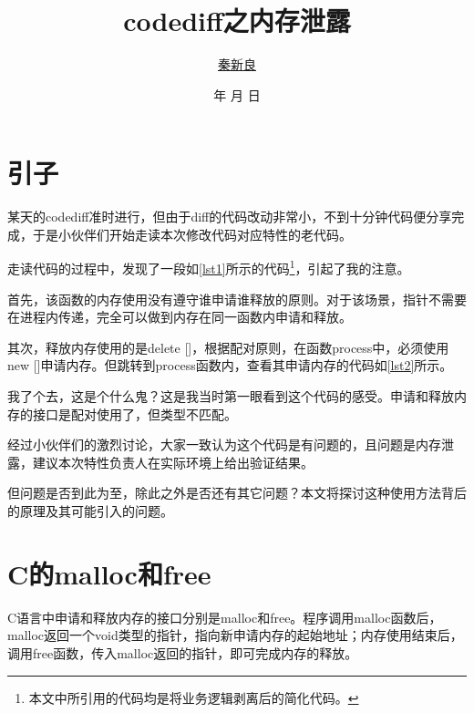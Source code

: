 \documentclass[a4paper, 12pt, titlepage]{article}
\newcommand*{\TitleFont}{\usefont{\encodingdefault}{\rmdefault}{b}{n}\fontsize{32}{40}\selectfont\CJKfamily{title}\color{seco}}%
\renewcommand{\today}{\color{seco}\number\year 年 \number\month 月 \number\day 日}
\begin{document}
\setlength{\parindent}{2em}

\title{\TitleFont codediff之内存泄露\vspace{8cm}}
\author{\href{mailto:q00148943@gmail.com}{\LARGE{秦新良}}}
\date{\vspace{0.5cm}\today}

\maketitle

\tableofcontents
\newpage

\section{引子}
某天的codediff准时进行，但由于diff的代码改动非常小，不到十分钟代码便分享完成，于是小伙伴们开始走读本次修改代码对应特性的老代码。

走读代码的过程中，发现了一段如\ref{lst1}所示的代码\footnote{本文中所引用的代码均是将业务逻辑剥离后的简化代码。}，引起了我的注意。
\begin{spacing}{1.0}
  
\end{spacing}

首先，该函数的内存使用没有遵守谁申请谁释放的原则。对于该场景，指针不需要在进程内传递，完全可以做到内存在同一函数内申请和释放。

其次，释放内存使用的是delete []，根据配对原则，在函数process中，必须使用new []申请内存。但跳转到process函数内，查看其申请内存的代码如\ref{lst2}所示。
\begin{spacing}{1.0}
  
\end{spacing}

我了个去，这是个什么鬼？这是我当时第一眼看到这个代码的感受。申请和释放内存的接口是配对使用了，但类型不匹配。

经过小伙伴们的激烈讨论，大家一致认为这个代码是有问题的，且问题是内存泄露，建议本次特性负责人在实际环境上给出验证结果。

但问题是否到此为至，除此之外是否还有其它问题？本文将探讨这种使用方法背后的原理及其可能引入的问题。

\section{C的malloc和free}
C语言中申请和释放内存的接口分别是malloc和free。程序调用malloc函数后，malloc返回一个void类型的指针，指向新申请内存的起始地址；内存使用结束后，调用free函数，传入malloc返回的指针，即可完成内存的释放。
\end{document}
